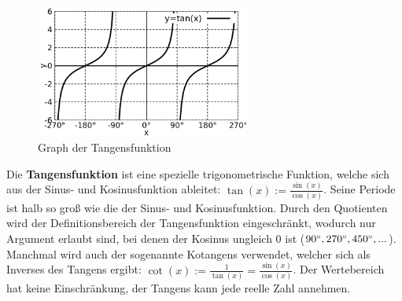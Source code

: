 \begin{minipage}[t]{1\textwidth}
    \begin{figure}
        \centering
        \includegraphics[width=7cm]{./gnuplot/base-function-tan}
        \caption{Graph der Tangensfunktion}
        \label{fig:ExBaseFunTan}
    \end{figure}
    Die \textbf{Tangensfunktion} ist eine spezielle trigonometrische Funktion, welche sich aus der Sinus- und Kosinusfunktion ableitet: $\tan(x) := \frac{\sin(x)}{\cos(x)}$. Seine Periode ist halb so groß wie die der Sinus- und Kosinusfunktion. Durch den Quotienten wird der Definitionsbereich der Tangensfunktion eingeschränkt, wodurch nur Argument erlaubt sind, bei denen der Kosinus ungleich $0$ ist ($\SI{90}{\degree}, \SI{270}{\degree}, \SI{450}{\degree}, ...$). Manchmal wird auch der sogenannte Kotangens verwendet, welcher sich als Inverses des Tangens ergibt: $\cot(x) := \frac{1}{\tan(x)} = \frac{\sin(x)}{\cos(x)}$. Der Wertebereich hat keine Einschränkung, der Tangens kann jede reelle Zahl annehmen.
\end{minipage}

